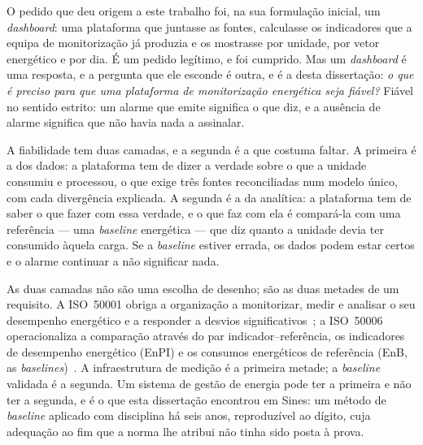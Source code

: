 O pedido que deu origem a este trabalho foi, na sua formulação inicial,
um \emph{dashboard}: uma plataforma que juntasse as fontes, calculasse
os indicadores que a equipa de monitorização já produzia e os mostrasse
por unidade, por vetor energético e por dia. É um pedido legítimo, e foi
cumprido. Mas um \emph{dashboard} é uma resposta, e a pergunta que ele
esconde é outra, e é a desta dissertação: \emph{o que é preciso para que
uma plataforma de monitorização energética seja fiável?} Fiável no
sentido estrito: um alarme que emite significa o que diz, e a ausência
de alarme significa que não havia nada a assinalar.

A fiabilidade tem duas camadas, e a segunda é a que costuma faltar. A
primeira é a dos dados: a plataforma tem de dizer a verdade sobre o que
a unidade consumiu e processou, o que exige três fontes reconciliadas
num modelo único, com cada divergência explicada. A segunda é a da
analítica: a plataforma tem de saber o que fazer com essa verdade, e o
que faz com ela é compará-la com uma referência --- uma \emph{baseline}
energética --- que diz quanto a unidade devia ter consumido àquela
carga. Se a \emph{baseline} estiver errada, os dados podem estar certos
e o alarme continuar a não significar nada.

As duas camadas não são uma escolha de desenho; são as duas metades de
um requisito. A ISO~50001 obriga a organização a monitorizar, medir e
analisar o seu desempenho energético e a responder a desvios
significativos~\cite[\S9.1]{ISO50001_2018}; a ISO~50006 operacionaliza a
comparação através do par indicador--referência, os indicadores de
desempenho energético (EnPI) e os consumos energéticos de referência
(EnB, as \emph{baselines})~\cite{ISO50006_2014}. A infraestrutura de
medição é a primeira metade; a \emph{baseline} validada é a segunda. Um
sistema de gestão de energia pode ter a primeira e não ter a segunda, e
é o que esta dissertação encontrou em Sines: um método de
\emph{baseline} aplicado com disciplina há seis anos, reproduzível ao
dígito, cuja adequação ao fim que a norma lhe atribui não tinha sido
posta à prova.


